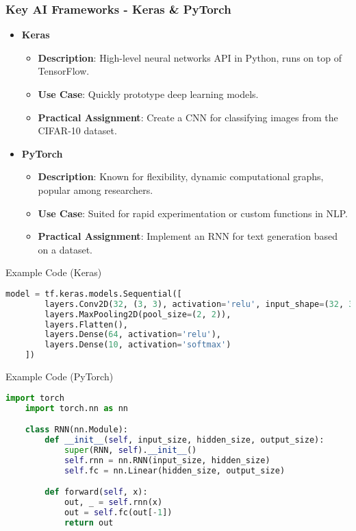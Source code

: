 \documentclass{beamer}
\begin{document}
\begin{frame}
    \frametitle{Key AI Frameworks - Keras \& PyTorch}
    \begin{itemize}
        \item \textbf{Keras}
            \begin{itemize}
                \item \textbf{Description}: High-level neural networks API in Python, runs on top of TensorFlow. 
                \item \textbf{Use Case}: Quickly prototype deep learning models.
                \item \textbf{Practical Assignment}: Create a CNN for classifying images from the CIFAR-10 dataset.
            \end{itemize}
        \item \textbf{PyTorch}
            \begin{itemize}
                \item \textbf{Description}: Known for flexibility, dynamic computational graphs, popular among researchers.
                \item \textbf{Use Case}: Suited for rapid experimentation or custom functions in NLP.
                \item \textbf{Practical Assignment}: Implement an RNN for text generation based on a dataset.
            \end{itemize}
    \end{itemize}
    \begin{block}{Example Code (Keras)}
    \begin{lstlisting}[language=Python]
    model = tf.keras.models.Sequential([
        layers.Conv2D(32, (3, 3), activation='relu', input_shape=(32, 32, 3)),
        layers.MaxPooling2D(pool_size=(2, 2)),
        layers.Flatten(),
        layers.Dense(64, activation='relu'),
        layers.Dense(10, activation='softmax')
    ])
    \end{lstlisting}
    \end{block}
    \begin{block}{Example Code (PyTorch)}
    \begin{lstlisting}[language=Python]
    import torch
    import torch.nn as nn

    class RNN(nn.Module):
        def __init__(self, input_size, hidden_size, output_size):
            super(RNN, self).__init__()
            self.rnn = nn.RNN(input_size, hidden_size)
            self.fc = nn.Linear(hidden_size, output_size)

        def forward(self, x):
            out, _ = self.rnn(x)
            out = self.fc(out[-1])
            return out
    \end{lstlisting}
    \end{block}
\end{frame}
\end{document}
